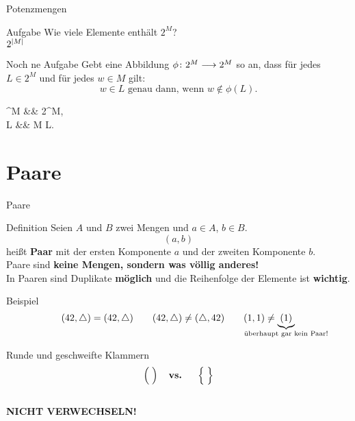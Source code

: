 \begin{frame}{Potenzmengen}
	\begin{block}{Aufgabe}
		Wie viele Elemente enthält $2^M$? \\[0.5em]
		
		\pause
		$2^{\left\lvert M \right\rvert}$
	\end{block}
	
	\pause
	\begin{block}{Noch ne Aufgabe}
		Gebt eine Abbildung $\phi \colon 2^{M} \longrightarrow 2^{M}$ so an,
		dass für jedes $L \in 2^{M}$ und für jedes $w \in M$ gilt:
		\begin{equation*}
			w \in L \text{ genau dann, wenn } w \notin \phi(L).
		\end{equation*}
		
		\pause
		\begin{threealign}
			\phi {}^{M} &\functionto& 2^{M},\\
			L &\mapsto& M \setminus L.
		\end{threealign}
	\end{block}
\end{frame}

\section{Paare}

\begin{frame}{Paare}
	\begin{block}{Definition}
		Seien $A$ und $B$ zwei Mengen und $a \in A$, $b \in B$.\\
		$$(a, b)$$ heißt \textbf{Paar} mit der ersten Komponente $a$ und der zweiten Komponente $b$.\\[1em]
		\pause
		Paare sind \textbf{keine Mengen, sondern was \alert{völlig anderes}!} \\
		In Paaren sind Duplikate \textbf{möglich} und die Reihenfolge der Elemente ist \textbf{wichtig}.\\
	\end{block}

	\pause
	\begin{block}{Beispiel}
		$$ (42, \triangle) = (42, \triangle) \qquad (42, \triangle) \neq (\triangle, 42) \qquad (1, 1) \neq \underbrace{(1)}_{\mathclap{\text{überhaupt gar kein Paar!}}} $$
	\end{block}
\end{frame}

\begin{frame}
	\centering
	\Huge
	\alert{Runde und geschweifte Klammern 
		   $$\Big(\;\Big) \textbf{\quad vs. \quad} \Big\{\;\Big\}$$ \\
		   \textbf{NICHT VERWECHSELN!}}
\end{frame}

